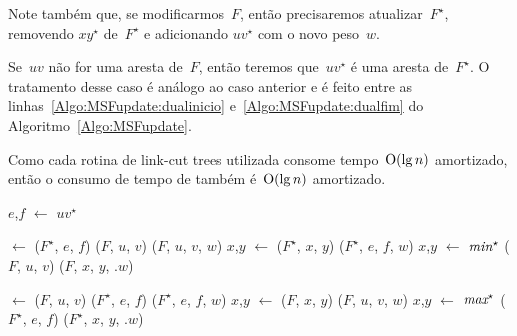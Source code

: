 Note também que, se modificarmos~$F$, então precisaremos atualizar~$F^\star$, removendo $xy^\star$ de~$F^\star$ e adicionando $uv^\star$ com o novo peso~$w$.

Se~$uv$ não for uma aresta de~$F$, então teremos que~$uv^\star$ é uma aresta de~$F^\star$.
O tratamento desse caso é análogo ao caso anterior e é feito entre as linhas~\ref{Algo:MSFupdate:dualinicio} e~\ref{Algo:MSFupdate:dualfim} do Algoritmo~\ref{Algo:MSFupdate}.

Como cada rotina de link-cut trees utilizada consome tempo~$\mathrm{O}(\lg n)$ amortizado, então o consumo de tempo de \MSFupdate{} também é~$\mathrm{O}(\lg n)$ amortizado.


\begin{algorithm}[htb]
\caption{\MSFupdate($G$, $u$, $v$, $w$)}
\label{Algo:MSFupdate}
\begin{algorithmic}[1]
\State $e$,$f$ $\gets$ $uv^\star$
\label{Algo:MSFupdate:linhauvinF}

\State {} $\gets$ \linkcutMin($F^\star$, $e$, $f$)
\State \linkcutDelEdge($F$, $u$, $v$)
\State \linkcutAddEdge($F$, $u$, $v$, $w$)
\Else
\State $x$,$y$ $\gets$ 
\State \linkcutDelEdge($F^\star$, $x$, $y$)
\State \linkcutAddEdge($F^\star$, $e$, $f$, $w$)
\State $x$,$y$ $\gets$ $\textit{min}^\star$
\State \linkcutDelEdge($F$, $u$, $v$)
\State \linkcutAddEdge($F$, $x$, $y$, .$w$)
\EndIf

\Else

\State {} $\gets$ \linkcutMax($F$, $u$, $v$)\label{Algo:MSFupdate:dualinicio}
\State \linkcutDelEdge($F^\star$, $e$, $f$)
\State \linkcutAddEdge($F^\star$, $e$, $f$, $w$)
\Else
\State $x$,$y$ $\gets$ 
\State \linkcutDelEdge($F$, $x$, $y$)
\State \linkcutAddEdge($F$, $u$, $v$, $w$)
\State $x$,$y$ $\gets$ $\textit{max}^\star$
\State \linkcutDelEdge($F^\star$, $e$, $f$)
\State \linkcutAddEdge($F^\star$, $x$, $y$, .$w$)\label{Algo:MSFupdate:dualfim}
\EndIf

\EndIf
\end{algorithmic}
\end{algorithm}
